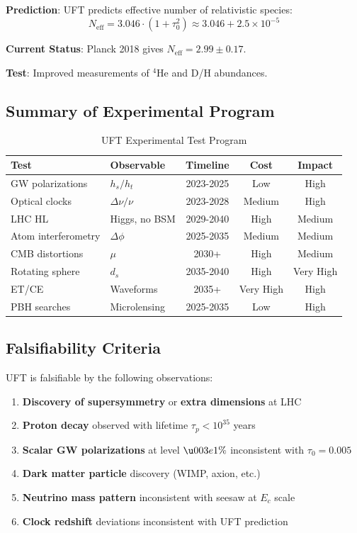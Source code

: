 \begin{test}
\textbf{Prediction}: UFT predicts effective number of relativistic species:
\begin{equation}
    N_{\text{eff}} = 3.046 \cdot (1 + \tau_0^2) \approx 3.046 + 2.5 \times 10^{-5}
\end{equation}

\textbf{Current Status}: Planck 2018 gives $N_{\text{eff}} = 2.99 \pm 0.17$.

\textbf{Test}: Improved measurements of $^4$He and D/H abundances.
\end{test}

\subsection{Summary of Experimental Program}

\begin{table}[htbp]
\centering
\caption{UFT Experimental Test Program}
\begin{tabular}{@{}llccc@{}}
\toprule
\textbf{Test} & \textbf{Observable} & \textbf{Timeline} & \textbf{Cost} & \textbf{Impact} \\
\midrule
GW polarizations & $h_s/h_t$ & 2023-2025 & Low & High \\
Optical clocks & $\Delta\nu/\nu$ & 2023-2028 & Medium & High \\
LHC HL & Higgs, no BSM & 2029-2040 & High & Medium \\
Atom interferometry & $\Delta\phi$ & 2025-2035 & Medium & Medium \\
CMB distortions & $\mu$ & 2030+ & High & Medium \\
Rotating sphere & $d_s$ & 2035-2040 & High & Very High \\
ET/CE & Waveforms & 2035+ & Very High & High \\
PBH searches & Microlensing & 2025-2035 & Low & High \\
\bottomrule
\end{tabular}
\end{table}

\subsection{Falsifiability Criteria}

UFT is falsifiable by the following observations:

\begin{enumerate}
    \item \textbf{Discovery of supersymmetry} or \textbf{extra dimensions} at LHC
    \item \textbf{Proton decay} observed with lifetime $\tau_p < 10^{35}$ years
    \item \textbf{Scalar GW polarizations} at level $\u003e 1\%$ inconsistent with $\tau_0 = 0.005$
    \item \textbf{Dark matter particle} discovery (WIMP, axion, etc.)
    \item \textbf{Neutrino mass pattern} inconsistent with seesaw at $E_c$ scale
    \item \textbf{Clock redshift} deviations inconsistent with UFT prediction
\end{enumerate}

